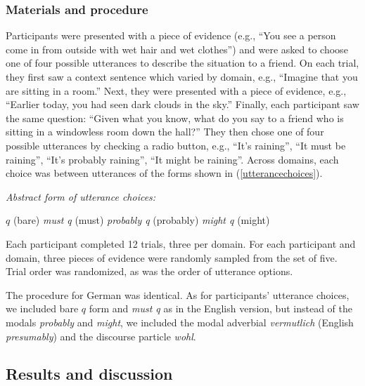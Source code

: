 \documentclass[11pt]{article}
\newcommand{\eref}[1]{(\ref{#1})}
\begin{document}
\subsubsection{Materials and procedure}

Participants were presented with a piece of evidence (e.g., ``You see a person come in from outside with wet hair and wet clothes'') and were asked to choose one of four possible utterances to describe the situation to a friend. On each trial, they first saw a context sentence which varied by domain, e.g., ``Imagine that you are sitting in a room.'' Next, they were presented with a piece of evidence, e.g., ``Earlier today, you had seen dark clouds in the sky.'' Finally, each participant saw the same question: ``Given what you know, what do you say to a friend who is sitting in a windowless room down the hall?'' They then chose one of four possible utterances by checking a radio button, e.g., ``It's raining'', ``It must be raining'', ``It's probably raining'', ``It might be raining''. Across domains, each choice was between utterances of the forms shown in \eref{utterancechoices}.

\begin{exe}
	\ex\label{utterancechoices} \emph{Abstract form of utterance choices:}
	\begin{xlist}
		\ex $q$ (bare)
		\ex \emph{must q} (must)
		\ex \emph{probably q} (probably)
		\ex \emph{might q} (might)
		\end{xlist}
		\end{exe}
		
Each participant completed 12 trials, three per domain. For each participant and domain, three pieces of evidence were randomly sampled from the set of five. Trial order was randomized, as was the order of utterance options.

The procedure for German was identical. As for participants' utterance choices, we included bare $q$ form and \emph{must q} as in the English version, but instead of the modals \emph{probably} and \emph{might}, we included the modal adverbial \emph{vermutlich} (English \emph{presumably}) and the discourse particle \emph{wohl}.

\subsection{Results and discussion}
\end{document}
